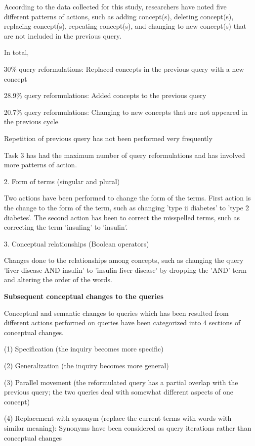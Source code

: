 \documentclass[]{article}
\begin{document}
According to the data collected for this study, researchers have noted five different patterns of actions, such as  adding concept(s), deleting concept(s), replacing concept(s), repeating concept(s),
and changing to new concept(s) that are not included in the previous query. 

In total,

30\% query reformulations: Replaced concepts in the previous query with a new concept

28.9\% query reformulations: Added concepts to the previous query

20.7\% query reformulations: Changing to new concepts that are not appeared in the previous cycle

Repetition of previous query has not been performed very frequently

Task 3 has had the maximum number of query reformulations and has involved more patterns of action.  


2. Form of terms (singular and plural)

Two actions have been performed to change the form of the terms. First action is the change to the form of the term, such as changing 'type ii diabetes' to 'type 2 diabetes'. The second action has been to correct the misspelled terms, such as correcting the term 'insuling' to 'insulin'. 

3. Conceptual relationships (Boolean operators)

Changes done to the relationships among concepts, such as changing the query 'liver disease AND insulin' to 'insulin liver disease' by dropping the 'AND' term and altering the order of the words. 

\textbf{Subsequent conceptual changes to the queries}

Conceptual and semantic changes to queries which has been resulted from different actions performed on queries have been categorized into 4 sections of conceptual changes.

(1) Specification (the inquiry becomes more specific)

(2) Generalization (the inquiry becomes more general)

(3) Parallel movement (the reformulated query has a
partial overlap with the previous query; the two queries deal with somewhat different aspects of one concept)

(4) Replacement with synonym (replace the current terms with words with similar meaning): Synonyms have been considered as query iterations rather than conceptual changes
\end{document}
